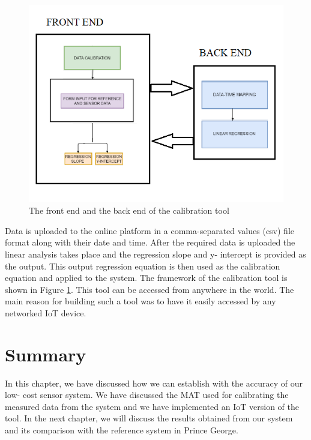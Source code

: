 \begin{figure}[h]
  \begin{center}
  \includegraphics[scale=1.09]{./images/figure32.png} 
  \end{center}
  \caption{The front end and the back end of the calibration tool}
  \label{frame}
\end{figure}

Data is uploaded to the online platform in a comma-separated values (csv) file format along with their date and time. After the required data is uploaded the linear analysis takes place and the regression slope and y- intercept is provided as the output. This output regression equation is then used as the calibration equation and applied to the system. The framework of the calibration tool is shown in Figure \ref{frame}. This tool can be accessed from anywhere in the world. The main reason for building such a tool was to have it easily accessed by any networked IoT device.



\section{Summary}

In this chapter, we have discussed how we can establish with the accuracy of our low- cost sensor system. We have discussed the MAT used for calibrating the measured data from the system and we have implemented an IoT version of the tool. In the next chapter, we will discuss the results obtained from our system and its comparison with the reference system in Prince George.



